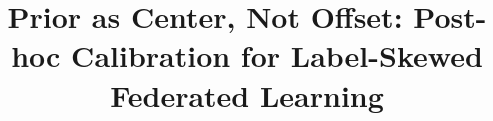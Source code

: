 \documentclass{svproc}
\begin{document}
\mainmatter
\title{Prior as Center, Not Offset: Post-hoc Calibration for Label-Skewed Federated Learning}
\author{}
\authorrunning{}
\tocauthor{}
\institute{}
\maketitle













\end{document}
